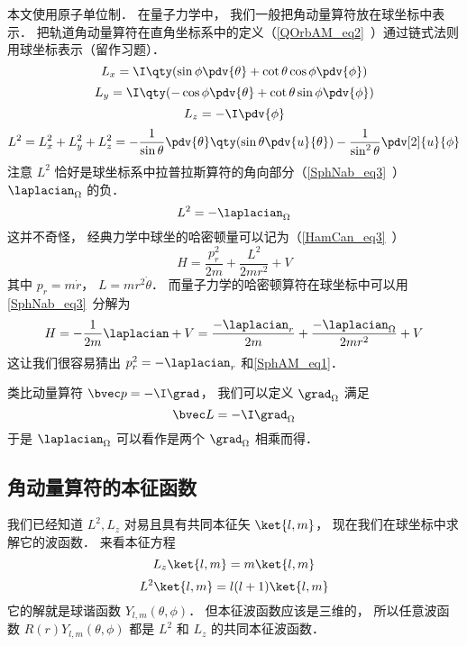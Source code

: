 

本文使用原子单位制． 在量子力学中， 我们一般把角动量算符放在球坐标中表示． 把轨道角动量算符在直角坐标系中的定义（\autoref{QOrbAM_eq2}~）通过链式法则用球坐标表示（留作习题）．
\begin{equation}
L_x = \I \qty(\sin\phi\pdv{\theta} + \cot\theta\cos\phi\pdv{\phi})
\end{equation}
\begin{equation}
L_y = \I \qty(-\cos\phi\pdv{\theta} + \cot\theta \sin\phi \pdv{\phi})
\end{equation}
\begin{equation}
L_z = -\I\pdv{\phi}
\end{equation}
\begin{equation}
L^2 = L_x^2 + L_y^2 + L_z^2 = -\frac{1}{\sin\theta}\pdv{\theta} \qty(\sin \theta \pdv{u}{\theta}) - \frac{1}{\sin^2 \theta} \pdv[2]{u}{\phi}
\end{equation}
注意 $L^2$ 恰好是球坐标系中拉普拉斯算符的角向部分（\autoref{SphNab_eq3}~） $\laplacian_\Omega$ 的负．
\begin{equation}\label{SphAM_eq1}
L^2 = -\laplacian_\Omega
\end{equation}
这并不奇怪， 经典力学中球坐的哈密顿量可以记为（\autoref{HamCan_eq3}~）
\begin{equation}
H = \frac{p_r^2}{2m} + \frac{L^2}{2mr^2} + V
\end{equation}
其中 $p_r = m\dot r$， $L = mr^2\dot\theta$． 而量子力学的哈密顿算符在球坐标中可以用\autoref{SphNab_eq3}~分解为
\begin{equation}
H = -\frac{1}{2m}\laplacian + V = \frac{-\laplacian_r}{2m} +\frac{-\laplacian_\Omega}{2mr^2} + V
\end{equation}
这让我们很容易猜出 $p_r^2 = -\laplacian_r$ 和\autoref{SphAM_eq1}．

类比动量算符 $\bvec p = -\I \grad$， 我们可以定义 $\grad_\Omega$ 满足
\begin{equation}
\bvec L = -\I \grad_\Omega
\end{equation}
于是 $\laplacian_\Omega$ 可以看作是两个 $\grad_\Omega$ 相乘而得．

\subsection{角动量算符的本征函数}
我们已经知道 $L^2, L_z$ 对易且具有共同本征矢 $\ket{l, m}$， 现在我们在球坐标中求解它的波函数． 来看本征方程
\begin{equation}
L_z \ket{l, m} = m\ket{l, m}
\end{equation}
\begin{equation}
L^2 \ket{l, m} = l(l+1)\ket{l, m}
\end{equation}
它的解就是球谐函数 $Y_{l,m}(\theta,\phi)$． 但本征波函数应该是三维的， 所以任意波函数 $R(r)Y_{l,m}(\theta, \phi)$ 都是 $L^2$ 和 $L_z$ 的共同本征波函数．
